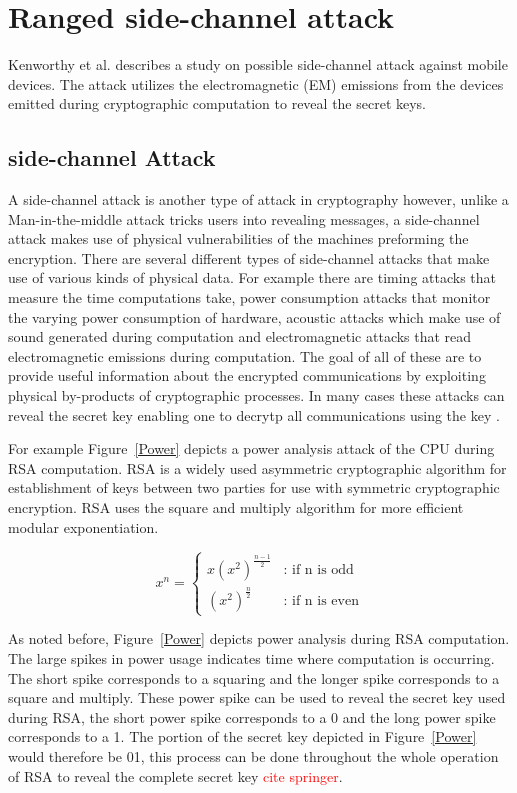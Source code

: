 \documentclass{sig-alternate}
\begin{document}
\section{Ranged side-channel attack}
\label{side}
Kenworthy et al. \cite{kenworthy} describes a study on possible side-channel attack against mobile devices. The attack utilizes the electromagnetic (EM) emissions from the devices emitted during cryptographic computation to reveal the secret keys.

\subsection{side-channel Attack}
A side-channel attack is another type of attack in cryptography however, unlike a Man-in-the-middle attack tricks users into revealing messages, a side-channel attack makes use of physical vulnerabilities of the machines preforming the encryption. There are several different types of side-channel attacks that make use of various kinds of physical data. For example there are timing attacks that measure the time computations take, power consumption attacks that monitor the varying power consumption of hardware, acoustic attacks which make use of sound generated during computation and electromagnetic attacks that read electromagnetic emissions during computation. The goal of all of these are to provide useful information about the encrypted communications by exploiting physical by-products of cryptographic processes. In many cases these attacks can reveal the secret key enabling one to decrytp all communications using the key  \cite{wiki:side-channel}.

For example Figure~\ref{Power} depicts a power analysis attack of the CPU during RSA computation. RSA is a widely used asymmetric cryptographic algorithm for establishment of keys between two parties for use with symmetric cryptographic encryption. RSA uses the square and multiply algorithm for more efficient modular exponentiation.

\[\tag{Square and Multiply}
x^n = \left\{
  \begin{array}{lr}
    x(x^2)^{\frac{n-1}{2}} &  \text{: if n is odd} \\
    (x^2)^{\frac{n}{2}} & \text{: if n is even}
  \end{array}
\right.
\]

  As noted before, Figure~\ref{Power} depicts power analysis during RSA computation. The large spikes in power usage indicates time where computation is occurring. The short spike corresponds to a squaring and the longer spike corresponds to a square and multiply. These power spike can be used to reveal the secret key used during RSA, the short power spike corresponds to a 0 and the long power spike corresponds to a 1. The portion of the secret key depicted in Figure~\ref{Power} would therefore be 01, this process can be done throughout the whole operation of RSA to reveal the complete secret key \textcolor{red}{cite springer}.
\end{document}
